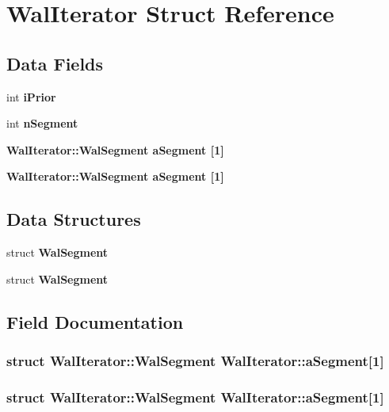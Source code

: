 \section{Wal\-Iterator Struct Reference}
\label{structWalIterator}
\subsection*{Data Fields}
\begin{CompactItemize}
\item 
int \bf{i\-Prior}
\item 
int \bf{n\-Segment}
\item 
\bf{Wal\-Iterator::Wal\-Segment} \bf{a\-Segment} [1]
\item 
\bf{Wal\-Iterator::Wal\-Segment} \bf{a\-Segment} [1]
\end{CompactItemize}
\subsection*{Data Structures}
\begin{CompactItemize}
\item 
struct \bf{Wal\-Segment}
\item 
struct \bf{Wal\-Segment}
\end{CompactItemize}


\subsection{Field Documentation}
\subsubsection{\setlength{\rightskip}{0pt plus 5cm}struct \bf{Wal\-Iterator::Wal\-Segment}  \bf{Wal\-Iterator::a\-Segment}[1]}\label{structWalIterator_d1346ee69d0e120a066b00f90763157b}


\subsubsection{\setlength{\rightskip}{0pt plus 5cm}struct \bf{Wal\-Iterator::Wal\-Segment}  \bf{Wal\-Iterator::a\-Segment}[1]}\label{structWalIterator_d1346ee69d0e120a066b00f90763157b}


